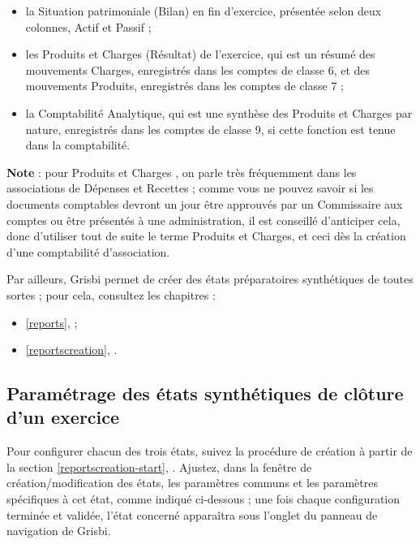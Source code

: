 \begin{itemize}
	\item la Situation patrimoniale (Bilan) en fin d'exercice, présentée selon deux colonnes, Actif et Passif ;
	\item les Produits et Charges (Résultat) de l'exercice, qui est un résumé des mouvements Charges, enregistrés dans les comptes de classe 6, et des mouvements Produits, enregistrés dans les comptes de classe 7 ;
	\item la Comptabilité Analytique, qui est une synthèse des Produits et Charges par nature, enregistrés dans les comptes de classe 9, si cette fonction est tenue dans la comptabilité.
\end{itemize}

\textbf{Note} : pour \og Produits et Charges \fg {}, on parle très fréquemment dans les associations de \og Dépenses et Recettes \fg{} ; comme vous ne pouvez savoir si les documents comptables devront un jour être approuvés par un Commissaire aux comptes ou être présentés à une administration, il est conseillé d'anticiper cela, donc d'utiliser tout de suite le terme Produits et Charges, et ceci dès la création d'une comptabilité d'association. 

Par ailleurs, Grisbi permet de créer des états préparatoires synthétiques de toutes sortes ; pour cela, consultez les chapitres :
\begin{itemize}
	\item \vref{reports},  ;
	\item \vref{reportscreation}, .
\end{itemize}


\subsection {Paramétrage des états synthétiques de clôture d'un exercice\label{association-plan-synthesis-parameters}}

Pour configurer chacun des trois états, suivez la procédure de création à partir de la section \vref{reportscreation-start}, . Ajustez, dans la fenêtre de création/modification des états, les paramètres communs et les paramètres spécifiques à cet état, comme indiqué ci-dessous ; une fois chaque configuration terminée et validée, l'état concerné apparaîtra sous l'onglet  du panneau de navigation de Grisbi.


